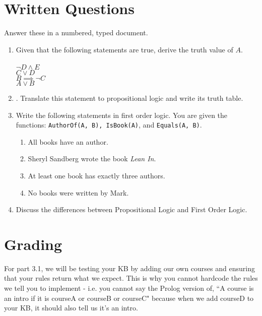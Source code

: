 \documentclass{article}
\begin{document}

\section{Written Questions}
Answer these in a numbered, typed document.
\begin{enumerate}
    \item Given that the following statements are true, derive the truth value of $A$.\\\\
        $\neg D \land E$\\
        $C \lor D$\\
        $B \implies \neg C$\\
        $A \lor B$
    \item {}. Translate this statement to propositional logic and write its truth table.
    \item Write the following statements in first order logic. You are given the functions: \verb|AuthorOf(A, B), IsBook(A)|, and \verb|Equals(A, B)|.
        \begin{enumerate}
            \item All books have an author.
            \item Sheryl Sandberg wrote the book \textit{Lean In}.
            \item At least one book has exactly three authors.
            \item No books were written by Mark.
        \end{enumerate}
    \item Discuss the differences between Propositional Logic and First Order Logic.
\end{enumerate} 


\section{Grading}
For part 3.1, we will be testing your KB by adding our own courses and ensuring that your rules return what we expect.
This is why you cannot hardcode the rules we tell you to implement - i.e. you cannot say the Prolog version of, ``A course is an intro if it is courseA or courseB or courseC" because when we add courseD to your KB, it should also tell us it's an intro.\\
\end{document}
